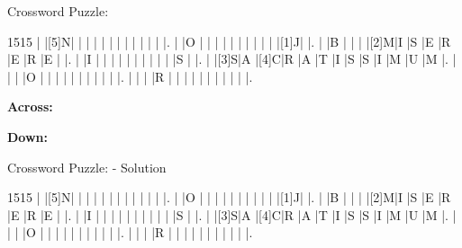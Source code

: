 \documentclass[12pt]{article}
\begin{document}
\begin{center}
  \huge{Crossword Puzzle:}
\end{center}
\vspace{1.5cm}
\begin{Puzzle}{15}{15}
  |{}  |[5]N|{}  |{}  |{}  |{}  |{}  |{}  |{}  |{}  |{}  |{}  |{}  |{}  |.
  |{}  |O   |{}  |{}  |{}  |{}  |{}  |{}  |{}  |{}  |{}  |{}  |[1]J|{}  |.
  |{}  |B   |{}  |{}  |{}  |[2]M|I   |S   |E   |R   |E   |R   |E   |{}  |.
  |{}  |I   |{}  |{}  |{}  |{}  |{}  |{}  |{}  |{}  |{}  |{}  |S   |{}  |.
  |{}  |[3]S|A   |[4]C|R   |A   |T   |I   |S   |S   |I   |M   |U   |M   |.
  |{}  |{}  |{}  |O   |{}  |{}  |{}  |{}  |{}  |{}  |{}  |{}  |{}  |{}  |.
  |{}  |{}  |{}  |R   |{}  |{}  |{}  |{}  |{}  |{}  |{}  |{}  |{}  |{}  |.
\end{Puzzle}
\begin{PuzzleClues}{\textbf{Across:}}
\end{PuzzleClues}
\begin{PuzzleClues}{\textbf{Down:}}
\end{PuzzleClues}
\newpage
\begin{center}
  \huge{Crossword Puzzle: - Solution}
\end{center}
\vspace{1.5cm}
\PuzzleSolution
\begin{Puzzle}{15}{15}
  |{}  |[5]N|{}  |{}  |{}  |{}  |{}  |{}  |{}  |{}  |{}  |{}  |{}  |{}  |.
  |{}  |O   |{}  |{}  |{}  |{}  |{}  |{}  |{}  |{}  |{}  |{}  |[1]J|{}  |.
  |{}  |B   |{}  |{}  |{}  |[2]M|I   |S   |E   |R   |E   |R   |E   |{}  |.
  |{}  |I   |{}  |{}  |{}  |{}  |{}  |{}  |{}  |{}  |{}  |{}  |S   |{}  |.
  |{}  |[3]S|A   |[4]C|R   |A   |T   |I   |S   |S   |I   |M   |U   |M   |.
  |{}  |{}  |{}  |O   |{}  |{}  |{}  |{}  |{}  |{}  |{}  |{}  |{}  |{}  |.
  |{}  |{}  |{}  |R   |{}  |{}  |{}  |{}  |{}  |{}  |{}  |{}  |{}  |{}  |.
\end{Puzzle}
\end{document}
